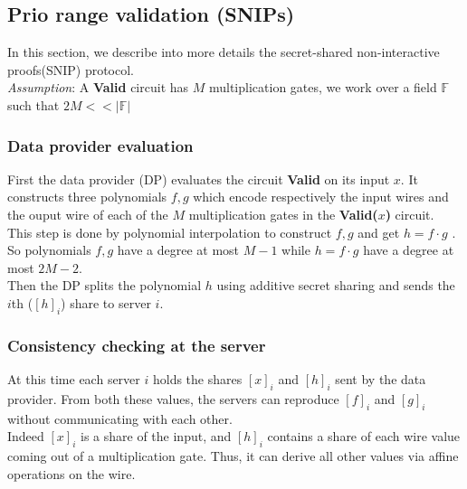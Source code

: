 \documentclass{article}
\begin{document}
\subsection{Prio range validation (SNIPs)}
In this section, we describe into more details the secret-shared non-interactive proofs(SNIP) protocol.\\
\textit{Assumption}: A \textbf{Valid} circuit has $M$ multiplication gates, we work over a field $\mathbb{F}$ such that $ 2M << |\mathbb{F}| $\\
\subsubsection{Data provider evaluation}
First the data provider (DP) evaluates the circuit \textbf{Valid} on its input $x$. It constructs three polynomials $f,g $ which encode respectively the input wires and the ouput wire of each of the $M$ multiplication gates in the \textbf{Valid($x$)} circuit.\\
This step is done by polynomial interpolation to construct $f,g$ and get $h = f \cdot g$ .\\
So polynomials $f,g$ have a degree at most $M-1$ while $h = f \cdot g$ have a degree at most $2M-2$.\\
Then the DP splits the polynomial $h$ using additive secret sharing and sends the $i$th ($[h]_i$) share to server $i$.
\subsubsection{Consistency checking at the server}
At this time each server $i$ holds the shares $[x]_i$ and $[h]_i$ sent by the data provider. From both these values, the servers can reproduce $[f]_i$ and $[g]_i$ without communicating with each other.\\
Indeed $[x]_i$ is a share of the input, and $[h]_i$ contains a share of each wire value coming out of a multiplication gate. Thus, it can derive all other values via affine operations on the wire.
\end{document}
